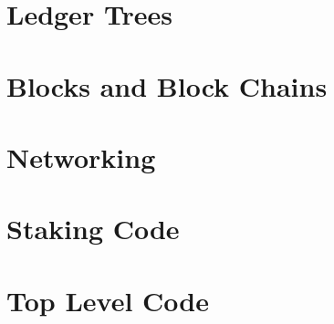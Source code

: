 \documentclass{book}
\begin{document}


\chapter{Ledger Trees}\label{chap:ctre}



\chapter{Blocks and Block Chains}\label{chap:block}



\chapter{Networking}\label{chap:net}



\chapter{Staking Code}\label{chap:stk}



\chapter{Top Level Code}\label{chap:top}



\printindex



\end{document}
